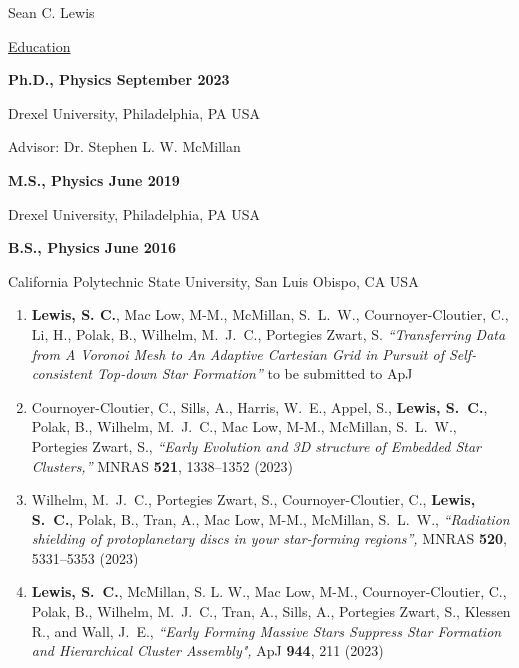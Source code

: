 \documentclass[twoside]{drexel-thesis}
\begin{document}
\begin{vita} %
\centerline{{\Huge{Sean C. Lewis}}}

{\underline{\LARGE{Education}}}{\underline{\hspace{5in}}}

\textbf{Ph.D., Physics September 2023}

\quad Drexel University, Philadelphia, PA USA

\quad\quad Advisor: Dr. Stephen L. W. McMillan

\textbf{M.S., Physics June 2019}

\quad Drexel University, Philadelphia, PA USA

\textbf{B.S., Physics June 2016}

\quad California Polytechnic State University, San Luis Obispo, CA USA


\begin{enumerate}
    \item \textbf{Lewis, S. C.}, {Mac Low}, M-M., {McMillan}, S.~L.~W., {Cournoyer-Cloutier}, C., {Li}, H., {Polak}, B., {Wilhelm}, M.~J.~C., {Portegies Zwart}, S. \textit{``Transferring Data from A Voronoi Mesh to An Adaptive Cartesian Grid in Pursuit of Self-consistent Top-down Star Formation''} to be submitted to ApJ

    \item {Cournoyer-Cloutier}, C., {Sills}, A., {Harris}, W.~E., {Appel}, S., \textbf{{Lewis}, S.~C.}, {Polak}, B., {Wilhelm}, M.~J.~C., {Mac Low}, M-M., {McMillan}, S.~L.~W., {Portegies Zwart}, S., \textit{``Early Evolution and 3D structure of Embedded Star Clusters,''} MNRAS \textbf{521}, 1338--1352 (2023)

    \item {Wilhelm}, M.~J.~C., {Portegies Zwart}, S., {Cournoyer-Cloutier}, C., \textbf{{Lewis}, S.~C.}, {Polak}, B., {Tran}, A., {Mac Low}, M-M., {McMillan}, S.~L.~W., \textit{``Radiation shielding of protoplanetary discs in your star-forming regions'',} MNRAS \textbf{520}, 5331--5353 (2023)
 
    \item \textbf{{Lewis}, S.~C.}, {McMillan}, S. L. W., {Mac Low}, M-M., {Cournoyer-Cloutier}, C., {Polak}, B., {Wilhelm}, M.~J.~C., {Tran}, A., {Sills}, A., {Portegies Zwart}, S., {Klessen} R., and {Wall}, J.~E., \textit{``Early Forming Massive Stars Suppress Star Formation and Hierarchical Cluster Assembly",} ApJ \textbf{944}, 211 (2023) %
 

\end{enumerate}
\end{vita}
\end{document}
